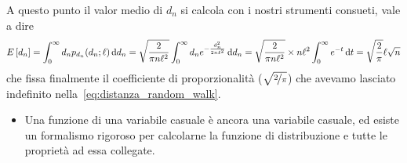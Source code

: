 A questo punto il valor medio di $d_n$ si calcola con i nostri strumenti
consueti, vale a dire
\begin{align}
  \expect{d_n} = \int_0^\infty d_n p_{d_n}(d_n; \ell) \diff[d_n] =
  \sqrt{\frac{2}{\pi n\ell^2}} \int_0^\infty d_ne^{-\frac{d_n^2}{2n\ell^2}} \diff[d_n] =
  \sqrt{\frac{2}{\pi n\ell^2}} \times n\ell^2 \int_0^\infty e^{-t} \diff[t] =
  \sqrt{\frac{2}{\pi}} \ell \sqrt{n}
\end{align}
che fissa finalmente il coefficiente di proporzionalità
($\sqrt{\nicefrac{2}{\pi}}$) che avevamo lasciato indefinito
nella~\eqref{eq:distanza_random_walk}.


\summary

\begin{itemize}
  \item Una funzione di una variabile casuale è ancora una variabile casuale,
  ed esiste un formalismo rigoroso per calcolarne la funzione di distribuzione e
  tutte le proprietà ad essa collegate.
\end{itemize}
